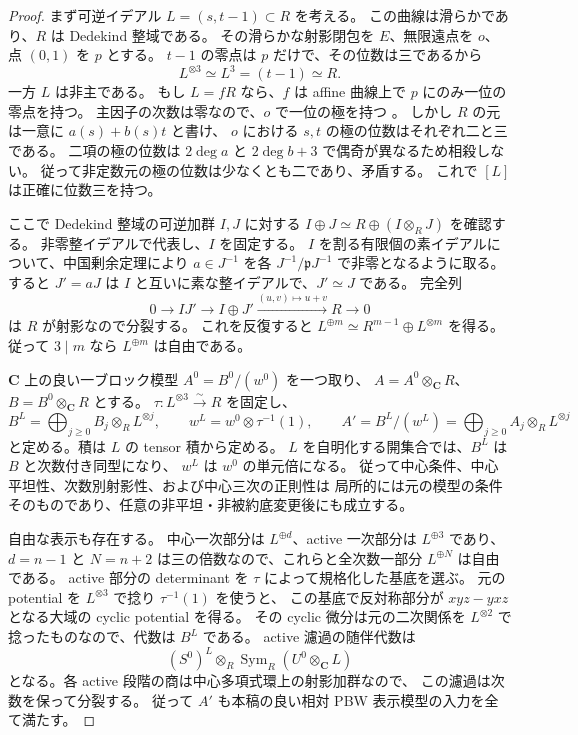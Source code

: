 \begin{proof}
まず可逆イデアル $L=(s,t-1)\subset R$ を考える。
この曲線は滑らかであり、$R$ は Dedekind 整域である。
その滑らかな射影閉包を $E$、無限遠点を $o$、
点 $(0,1)$ を $p$ とする。
$t-1$ の零点は $p$ だけで、その位数は三であるから
\[
 L^{\otimes3}\simeq L^3=(t-1)\simeq R.
\]
一方 $L$ は非主である。
もし $L=fR$ なら、$f$ は affine 曲線上で $p$ にのみ一位の零点を持つ。
主因子の次数は零なので、$o$ で一位の極を持つ
\cite[Tag~02RU]{NFMStacksCurveDivisor}。
しかし $R$ の元は一意に $a(s)+b(s)t$ と書け、
$o$ における $s,t$ の極の位数はそれぞれ二と三である。
二項の極の位数は $2\deg a$ と $2\deg b+3$ で偶奇が異なるため相殺しない。
従って非定数元の極の位数は少なくとも二であり、矛盾する。
これで $[L]$ は正確に位数三を持つ。

ここで Dedekind 整域の可逆加群 $I,J$ に対する
$I\oplus J\simeq R\oplus(I\otimes_RJ)$ を確認する。
非零整イデアルで代表し、$I$ を固定する。
$I$ を割る有限個の素イデアルについて、中国剰余定理により
$a\in J^{-1}$ を各 $J^{-1}/\mathfrak pJ^{-1}$ で非零となるように取る。
すると $J'=aJ$ は $I$ と互いに素な整イデアルで、$J'\simeq J$ である。
完全列
\[
 0\longrightarrow IJ'\longrightarrow I\oplus J'
 \xrightarrow{(u,v)\mapsto u+v}R\longrightarrow0
\]
は $R$ が射影なので分裂する。
これを反復すると
$L^{\oplus m}\simeq R^{m-1}\oplus L^{\otimes m}$ を得る。
従って $3\mid m$ なら $L^{\oplus m}$ は自由である。

$\mathbf C$ 上の良い一ブロック模型 $A^0=B^0/(w^0)$ を一つ取り、
$A=A^0\otimes_{\mathbf C}R$、$B=B^0\otimes_{\mathbf C}R$ とする。
$\tau:L^{\otimes3}\xrightarrow{\sim}R$ を固定し、
\[
 B^L=\bigoplus_{j\ge0}B_j\otimes_RL^{\otimes j},\qquad
 w^L=w^0\otimes\tau^{-1}(1),\qquad
 A'=B^L/(w^L)=\bigoplus_{j\ge0}A_j\otimes_RL^{\otimes j}
\]
と定める。積は $L$ の tensor 積から定める。
$L$ を自明化する開集合では、$B^L$ は $B$ と次数付き同型になり、
$w^L$ は $w^0$ の単元倍になる。
従って中心条件、中心平坦性、次数別射影性、および中心三次の正則性は
局所的には元の模型の条件そのものであり、任意の非平坦・非被約底変更後にも成立する。

自由な表示も存在する。
中心一次部分は $L^{\oplus d}$、active 一次部分は $L^{\oplus3}$ であり、
$d=n-1$ と $N=n+2$ は三の倍数なので、これらと全次数一部分 $L^{\oplus N}$ は自由である。
active 部分の determinant を $\tau$ によって規格化した基底を選ぶ。
元の potential を $L^{\otimes3}$ で捻り $\tau^{-1}(1)$ を使うと、
この基底で反対称部分が $xyz-yxz$ となる大域の cyclic potential を得る。
その cyclic 微分は元の二次関係を $L^{\otimes2}$ で捻ったものなので、代数は $B^L$ である。
active 濾過の随伴代数は
\[
 (S^0)^L\otimes_R\operatorname{Sym}_R(U^0\otimes_{\mathbf C}L)
\]
となる。各 active 段階の商は中心多項式環上の射影加群なので、
この濾過は次数を保って分裂する。
従って $A'$ も本稿の良い相対 PBW 表示模型の入力を全て満たす。


\end{proof}
